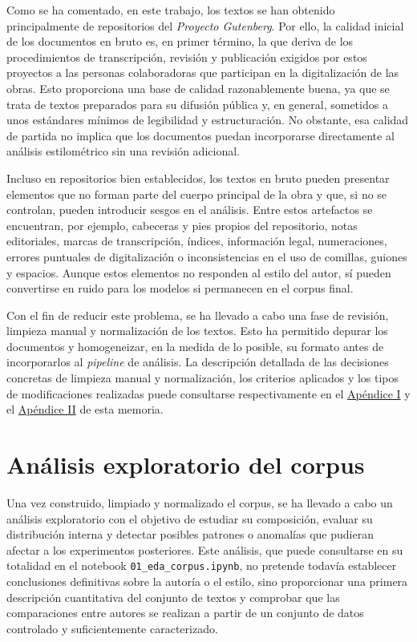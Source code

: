 \documentclass[IB]{TFUOC}%
\begin{document}
Como se ha comentado, en este trabajo, los textos se han obtenido principalmente de repositorios del \textit{Proyecto Gutenberg}. Por ello, la calidad inicial de los documentos en bruto es, en primer término, la que deriva de los procedimientos de transcripción, revisión y publicación exigidos por estos proyectos a las personas colaboradoras que participan en la digitalización de las obras. Esto proporciona una base de calidad razonablemente buena, ya que se trata de textos preparados para su difusión pública y, en general, sometidos a unos estándares mínimos de legibilidad y estructuración. No obstante, esa calidad de partida no implica que los documentos puedan incorporarse directamente al análisis estilométrico sin una revisión adicional.

Incluso en repositorios bien establecidos, los textos en bruto pueden presentar elementos que no forman parte del cuerpo principal de la obra y que, si no se controlan, pueden introducir sesgos en el análisis. Entre estos artefactos se encuentran, por ejemplo, cabeceras y pies propios del repositorio, notas editoriales, marcas de transcripción, índices, información legal, numeraciones, errores puntuales de digitalización o inconsistencias en el uso de comillas, guiones y espacios. Aunque estos elementos no responden al estilo del autor, sí pueden convertirse en ruido para los modelos si permanecen en el corpus final.

Con el fin de reducir este problema, se ha llevado a cabo una fase de revisión, limpieza manual y normalización de los textos. Esto ha permitido depurar los documentos y homogeneizar, en la medida de lo posible, su formato antes de incorporarlos al \textit{pipeline} de análisis. La descripción detallada de las decisiones concretas de limpieza manual y normalización, los criterios aplicados y los tipos de modificaciones realizadas puede consultarse respectivamente en el \hyperref[apx:limpieza-manual]{Apéndice I} y el \hyperref[apx:normalizacion]{Apéndice II} de esta memoria.

\section{Análisis exploratorio del corpus}

Una vez construido, limpiado y normalizado el corpus, se ha llevado a cabo un análisis exploratorio con el objetivo de estudiar su composición, evaluar su distribución interna y detectar posibles patrones o anomalías que pudieran afectar a los experimentos posteriores. Este análisis, que puede consultarse en su totalidad en el notebook \texttt{01\_eda\_corpus.ipynb}, no pretende todavía establecer conclusiones definitivas sobre la autoría o el estilo, sino proporcionar una primera descripción cuantitativa del conjunto de textos y comprobar que las comparaciones entre autores se realizan a partir de un conjunto de datos controlado y suficientemente caracterizado.
\end{document}
